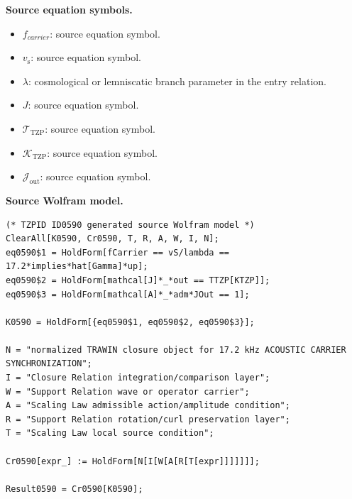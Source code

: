 \begin{minipage}[t]{0.49\linewidth}
\begingroup
\small
\raggedright
\textbf{Source equation symbols.}\par
\begin{itemize}[leftmargin=1.35em,itemsep=1pt,topsep=1pt,parsep=0pt]
    \item $f_{carrier}$: source equation symbol.
    \item $v_{\mathrm{s}}$: source equation symbol.
    \item $\lambda$: cosmological or lemniscatic branch parameter in the entry relation.
    \item $J$: source equation symbol.
    \item $\mathcal{T}_{\mathrm{TZP}}$: source equation symbol.
    \item $\mathcal{K}_{\mathrm{TZP}}$: source equation symbol.
    \item $\mathcal{J}_{\mathrm{out}}$: source equation symbol.
\end{itemize}
\endgroup
\end{minipage}\hfill
\begin{minipage}[t]{0.47\linewidth}
\begingroup
\scriptsize
\raggedright
\textbf{Source Wolfram model.}\par
\begin{Verbatim}[fontsize=\tiny,breaklines=true,breakanywhere=true]
(* TZPID ID0590 generated source Wolfram model *)
ClearAll[K0590, Cr0590, T, R, A, W, I, N];
eq0590$1 = HoldForm[fCarrier == vS/lambda == 17.2*implies*hat[Gamma]*up];
eq0590$2 = HoldForm[mathcal[J]*_*out == TTZP[KTZP]];
eq0590$3 = HoldForm[mathcal[A]*_*adm*JOut == 1];

K0590 = HoldForm[{eq0590$1, eq0590$2, eq0590$3}];

N = "normalized TRAWIN closure object for 17.2 kHz ACOUSTIC CARRIER SYNCHRONIZATION";
I = "Closure Relation integration/comparison layer";
W = "Support Relation wave or operator carrier";
A = "Scaling Law admissible action/amplitude condition";
R = "Support Relation rotation/curl preservation layer";
T = "Scaling Law local source condition";

Cr0590[expr_] := HoldForm[N[I[W[A[R[T[expr]]]]]]];

Result0590 = Cr0590[K0590];
\end{Verbatim}
\endgroup
\end{minipage}

